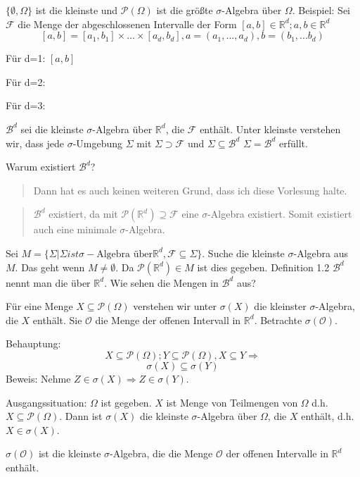 $\{\emptyset, \Omega\}$ ist die kleinste und $\mathcal P(\Omega)$ ist die größte $\sigma$-Algebra über $\Omega$.
Beispiel:
Sei $\mathcal F$ die Menge der abgeschlossenen Intervalle der Form $[a,b] \in \mathbb R^d; a,b \in \mathbb R^d$
$$ [a,b]=[a_1,b_1] \times ... \times [a_d,b_d], a=(a_1,...,a_d), b=(b_1	,...b_d)$$

Für d=1: $[a,b]$

Für d=2: 

Für d=3: 

$\mathcal B^d$ sei die kleinste $\sigma$-Algebra über $\mathbb R^d$, die $\mathcal F$ enthält. Unter kleinste verstehen wir, dass jede $\sigma$-Umgebung $\Sigma$ mit $\Sigma \supset \mathcal F$ und $\Sigma \subseteq \mathcal{B}^d$ $\Sigma = \mathcal{B}^d$ erfüllt.

Warum existiert $\mathcal{B}^d$?
\begin{quote}
 Dann hat es auch keinen weiteren Grund, dass ich diese Vorlesung halte.
\end{quote}
\begin{quote}
 $\mathcal{B}^d$ existiert, da mit $\mathcal P(\mathbb R^d) \supseteq \mathcal F$ eine $\sigma$-Algebra existiert. Somit existiert auch eine minimale $\sigma$-Algebra.
\end{quote}
Sei $M=\{\Sigma | \Sigma ist \sigma-\textrm{Algebra über} \mathbb R^d, \mathcal F \subseteq \Sigma\}$.
Suche die kleinste $\sigma$-Algebra aus $M$. Das geht wenn $M \neq \emptyset$. Da $\mathcal P(\mathbb R^d) \in M$ ist dies gegeben.
Definition 1.2 $\mathcal B^d$ nennt man die  über $\mathbb{R}^d$.
Wie sehen die Mengen in $\mathcal B^d$ aus?

Für eine Menge $X \subseteq \mathcal P(\Omega)$ verstehen wir unter $\sigma(X)$ die kleinster $\sigma$-Algebra, die $X$ enthält. Sie $\mathcal O$ die Menge der offenen Intervall in $\mathbb R^d$. Betrachte $\sigma(\mathcal O)$.

Behauptung:
$$ X \subseteq \mathcal P(\Omega); Y \subseteq \mathcal P(\Omega), X \subseteq Y \Rightarrow$$
$$ \sigma(X) \subseteq \sigma(Y)$$
Beweis: Nehme $Z \in \sigma(X) \Rightarrow Z \in \sigma(Y)$.

Ausgangssituation:
$\Omega$ ist gegeben. $X$ ist Menge von Teilmengen von $\Omega$ d.h. $X \subseteq \mathcal P(\Omega)$.
Dann ist $\sigma(X)$ die kleinste $\sigma$-Algebra über $\Omega$, die $X$ enthält, d.h. $X \in \sigma(X)$.

$\sigma(\mathcal O)$ ist die kleinste $\sigma$-Algebra, die die Menge $\mathcal O$ der offenen Intervalle in $\mathbb R^d$ enthält.

